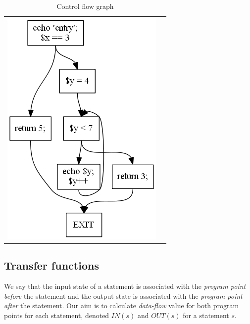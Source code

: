 \begin{table}[h]
  \begin{tabular}{ l | m{6cm} }
  \centering
    \includegraphics[scale=0.7]{img/cfg.png}
  &
 
\begin{minipage}{6cm}
%        
%
\end{minipage}

  \\
  \end{tabular}
  \caption{Control flow graph\label{cfg}}  
\end{table}        
        
        \subsection{Transfer functions}
        
        We say that the input state of a statement is associated with 
        the \emph{program point before} the statement and the output state 
        is associated with the \emph{program point after} the statement. 
        Our aim is to calculate \emph{data-flow} value for both 
        program points for each statement, denoted $IN(s)$ and $OUT(s)$ for 
        a statement $s$.
        
